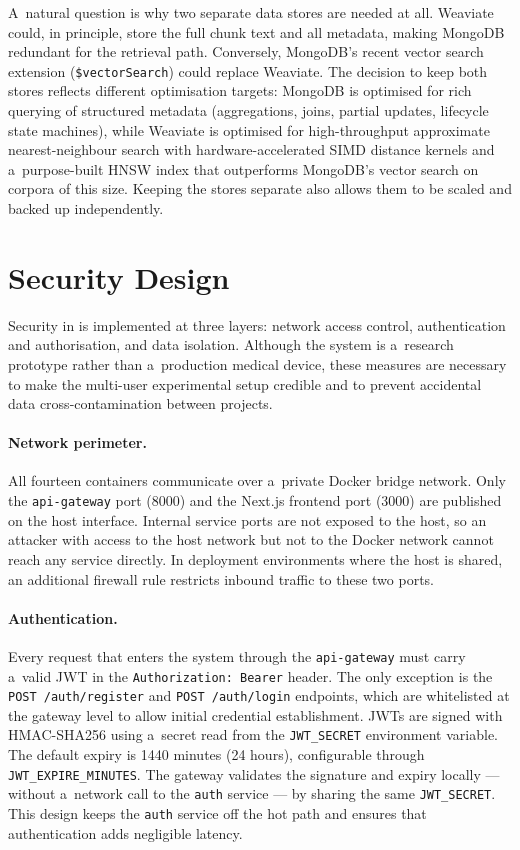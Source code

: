 A~natural question is why two separate data stores are needed at all.
Weaviate could, in principle, store the full chunk text and all metadata,
making MongoDB redundant for the retrieval path.  Conversely, MongoDB's
recent vector search extension (\texttt{\$vectorSearch}) could replace
Weaviate.  The decision to keep both stores reflects different optimisation
targets: MongoDB is optimised for rich querying of structured metadata
(aggregations, joins, partial updates, lifecycle state machines), while
Weaviate is optimised for high-throughput approximate nearest-neighbour
search with hardware-accelerated SIMD distance kernels and a~purpose-built
HNSW index that outperforms MongoDB's vector search on corpora of this size.
Keeping the stores separate also allows them to be scaled and backed up
independently.

\section{Security Design}
\label{sec:security}

Security in \medrag{} is implemented at three layers: network access control,
authentication and authorisation, and data isolation.  Although the system
is a~research prototype rather than a~production medical device, these
measures are necessary to make the multi-user experimental setup credible and
to prevent accidental data cross-contamination between projects.

\paragraph{Network perimeter.}
All fourteen containers communicate over a~private Docker bridge network.
Only the \texttt{api-gateway} port (8000) and the Next.js frontend port
(3000) are published on the host interface.  Internal service ports are
not exposed to the host, so an attacker with access to the host network
but not to the Docker network cannot reach any service directly.  In
deployment environments where the host is shared, an additional firewall
rule restricts inbound traffic to these two ports.

\paragraph{Authentication.}
Every request that enters the system through the \texttt{api-gateway}
must carry a~valid JWT in the \texttt{Authorization: Bearer} header.  The
only exception is the \texttt{POST /auth/register} and
\texttt{POST /auth/login} endpoints, which are whitelisted at the gateway
level to allow initial credential establishment.  JWTs are signed with
HMAC-SHA256 using a~secret read from the \texttt{JWT\_SECRET} environment
variable.  The default expiry is 1440 minutes (24 hours), configurable
through \texttt{JWT\_EXPIRE\_MINUTES}.  The gateway validates the signature
and expiry locally --- without a~network call to the \texttt{auth} service ---
by sharing the same \texttt{JWT\_SECRET}.  This design keeps the \texttt{auth}
service off the hot path and ensures that authentication adds negligible
latency.


